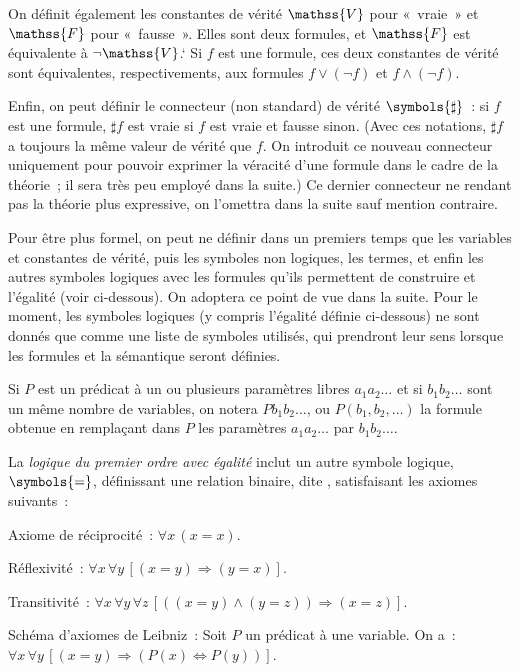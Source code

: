 On définit également les constantes de vérité $\mathss{V}$ pour « vraie » et $\mathss{F}$ pour « fausse ». 
Elles sont deux formules, et $\mathss{F}$ est équivalente à $\lnot \mathss{V}$.`
Si $f$ est une formule, ces deux constantes de vérité sont équivalentes, respectivements, aux formules $f \vee (\lnot f)$ et $f \wedge (\lnot f)$. 

Enfin, on peut définir le connecteur (non standard) de vérité $\symbols{\sharp}$ : si $f$ est une formule, $\sharp f$ est vraie si $f$ est vraie et fausse sinon. 
(Avec ces notations, $\sharp f$ a toujours la même valeur de vérité que $f$. 
On introduit ce nouveau connecteur uniquement pour pouvoir exprimer la véracité d'une formule dans le cadre de la théorie ; il sera très peu employé dans la suite.)
Ce dernier connecteur ne rendant pas la théorie plus expressive, on l'omettra dans la suite sauf mention contraire.

Pour être plus formel, on peut ne définir dans un premiers temps que les variables et constantes de vérité, puis les symboles non logiques, les termes, et enfin les autres symboles logiques avec les formules qu'ils permettent de construire et l'égalité (voir ci-dessous). 
On adoptera ce point de vue dans la suite. 
Pour le moment, les symboles logiques (y compris l'égalité définie ci-dessous) ne sont donnés que comme une liste de symboles utilisés, qui prendront leur sens lorsque les formules et la sémantique seront définies.

Si $P$ est un prédicat à un ou plusieurs paramètres libres $a_1 a_2 \dots$ et si $b_1 b_2 \dots$ sont un même nombre de variables, on notera $P b_1 b_2 \dots$, ou $P(b_1, b_2, \dots)$ la formule obtenue en remplaçant dans $P$ les paramètres $a_1 a_2 \dots$ par $b_1 b_2 \dots$.

\stopsubsection


\startsubsection[title=Égalité]

La \emph{logique du premier ordre avec égalité} inclut un autre symbole logique, $\symbols{=}$, définissant une relation binaire, dite \emph{}, satisfaisant les axiomes suivants : 
\startitemize
  \item Axiome de réciprocité : $\forall x \, (x = x)$. 
  \item Réflexivité : $\forall x \, \forall y \, [ (x=y) \Rightarrow (y=x) ]$.
  \item Transitivité : $\forall x \, \forall y \, \forall z \, [((x=y) \wedge (y=z)) \Rightarrow (x=z)]$.
  \item Schéma d'axiomes de Leibniz : Soit $P$ un prédicat à une variable. On a : $\forall x \, \forall y \, [ (x = y) \Rightarrow (P(x) \Leftrightarrow P(y))]$.
\stopitemize

